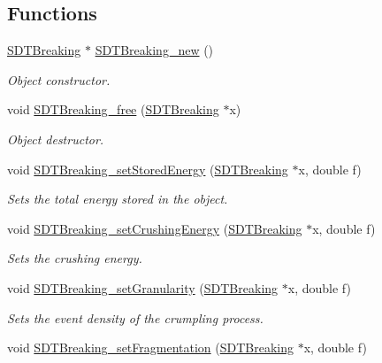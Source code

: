 \subsection*{Functions}
\begin{DoxyCompactItemize}
\item 
\hyperlink{group__breaking_gaf66ba3e9569d061a0d6337a24bce1dc5}{S\+D\+T\+Breaking} $\ast$ \hyperlink{group__breaking_ga39727589c894fa0bbddfa84330c49768}{S\+D\+T\+Breaking\+\_\+new} ()
\begin{DoxyCompactList}\small\item\em Object constructor. \end{DoxyCompactList}\item 
void \hyperlink{group__breaking_ga22047c794361f1c91df0f8665786d58e}{S\+D\+T\+Breaking\+\_\+free} (\hyperlink{group__breaking_gaf66ba3e9569d061a0d6337a24bce1dc5}{S\+D\+T\+Breaking} $\ast$x)
\begin{DoxyCompactList}\small\item\em Object destructor. \end{DoxyCompactList}\item 
void \hyperlink{group__breaking_ga9c62b00b5e6b52a3ba591c987a3afe04}{S\+D\+T\+Breaking\+\_\+set\+Stored\+Energy} (\hyperlink{group__breaking_gaf66ba3e9569d061a0d6337a24bce1dc5}{S\+D\+T\+Breaking} $\ast$x, double f)
\begin{DoxyCompactList}\small\item\em Sets the total energy stored in the object. \end{DoxyCompactList}\item 
void \hyperlink{group__breaking_ga2b8e7a030bbca5807ee047d078067233}{S\+D\+T\+Breaking\+\_\+set\+Crushing\+Energy} (\hyperlink{group__breaking_gaf66ba3e9569d061a0d6337a24bce1dc5}{S\+D\+T\+Breaking} $\ast$x, double f)
\begin{DoxyCompactList}\small\item\em Sets the crushing energy. \end{DoxyCompactList}\item 
void \hyperlink{group__breaking_gab5b53d06e7b1a144ca755ad51768d93f}{S\+D\+T\+Breaking\+\_\+set\+Granularity} (\hyperlink{group__breaking_gaf66ba3e9569d061a0d6337a24bce1dc5}{S\+D\+T\+Breaking} $\ast$x, double f)
\begin{DoxyCompactList}\small\item\em Sets the event density of the crumpling process. \end{DoxyCompactList}\item 
void \hyperlink{group__breaking_gad80e128f84e8aab1b403a94e53216d0f}{S\+D\+T\+Breaking\+\_\+set\+Fragmentation} (\hyperlink{group__breaking_gaf66ba3e9569d061a0d6337a24bce1dc5}{S\+D\+T\+Breaking} $\ast$x, double f)

\end{DoxyCompactItemize}

